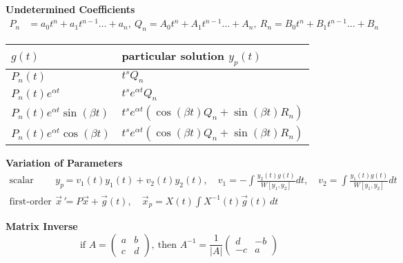 \begin{center}
    \vspace{4pt}
    \textbf{Undetermined Coefficients} 
    \begin{align*}
        P_n &= a_0t^n + a_1t^{n-1} \ldots + a_n, \
        Q_n = A_0t^n + A_1t^{n-1} \ldots + A_n, \       
        R_n = B_0t^n + B_1t^{n-1} \ldots + B_n     
    \end{align*}
    \vspace{-0.4cm}
    \setlength{\extrarowheight}{0.05cm}
    \begin{tabular}{ p{3.9cm} p{5cm} }
        $g(t)$ &  particular solution $y_p(t)$ 
        \\[2pt] \hline $P_n(t)$  & $t^s Q_n$   \\        
        $P_n(t)e^{\alpha t}$ &  $t^s e^{\alpha t}Q_n$\\       
        $P_n(t)e^{\alpha t}\sin(\beta t)$ & $t^s e^{\alpha t} \left(\cos(\beta t)Q_n+\sin(\beta t) R_n\right)$\\
        $P_n(t)e^{\alpha t}\cos(\beta t)$ & $t^s e^{\alpha t} \left(\cos(\beta t)Q_n+\sin(\beta t) R_n\right)$\\[2pt] \hline
    \end{tabular}
    \setlength{\extrarowheight}{0.0cm}

    \vspace{14pt}
    \textbf{Variation of Parameters}    
    \begin{align*}
        \text{scalar form: } y_p &= v_1 (t) y_1(t) + v_2(t) y_2(t) , \quad 
        v_1 = - \int \frac{y_2(t)g(t)}{W[y_1,y_2]}dt , \quad 
        v_2 = \int \frac{y_1(t)g(t)}{W[y_1,y_2]} dt \\
        \text{first-order system: }\vec x \, ' &= P \vec x + \vec g(t), \quad \vec x_p = X(t) \int X^{-1}(t) \vec g(t) \, dt
    \end{align*}        
    
    \vspace{1pt}
    \textbf{Matrix Inverse}  
    $$\text{if } A= \begin{pmatrix} a& b\\c&d\end{pmatrix}, \ \text{then } A^{-1} = \frac{1}{|A|}\begin{pmatrix} d&-b\\-c&a\end{pmatrix}$$
\end{center}